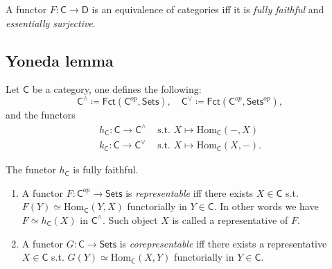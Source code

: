 \begin{prop}
	A functor $F\colon \mathsf{C} \to \mathsf{D}$ is an equivalence of categories iff it is {\em fully faithful} and {\em essentially surjective}.
\end{prop} 

\subsection{Yoneda lemma}

\begin{defn}[]
	Let $\mathsf{C}$ be a category, one defines the following:
	\begin{equation}
	\mathsf{C}^\wedge \coloneqq \mathsf{Fct}\left(\mathsf{C}^{op}, \mathsf{Sets} \right), \quad \mathsf{C}^\vee \coloneqq \mathsf{Fct}\left(\mathsf{C}^{op}, \mathsf{Sets}^{op} \right)
	,\end{equation} 
	and the functors
	\begin{align}
		h_\mathsf{C}\colon \mathsf{C} \to \mathsf{C}^\wedge &\text{ s.t. }
		X \mapsto \mathrm{Hom}_{\mathsf{\mathsf{C}}} \left( -, X \right)\\
		k_\mathsf{C}\colon \mathsf{C} \to \mathsf{C}^\vee &\text{ s.t. }
		X \mapsto \mathrm{Hom}_{\mathsf{\mathsf{C}}} \left( X, - \right)
	.\end{align}
\end{defn}

\begin{lem}[Yoneda]
	The functor $h_\mathsf{C}$ is fully faithful.
\end{lem} 

\begin{defn}\leavevmode\vspace{-\baselineskip}
	\begin{enumerate}
		\item A functor $F\colon \mathsf{C}^{op} \to \mathsf{Sets}$ is {\em representable} iff there exists $X \in \mathsf{C}$ s.t. $F(Y) \simeq \mathrm{Hom}_{\mathsf{C}} \left( Y, X \right)$ functorially in $Y \in \mathsf{C}$.
			In other words we have $F \simeq h_\mathsf{C}(X)$ in $\mathsf{C}^{\wedge}$. 
			Such object $X$ is called a representative of $F$.
		\item A functor $G\colon \mathsf{C} \to \mathsf{Sets}$ is {\em corepresentable} iff there exists a representative $X \in \mathsf{C}$ s.t. $G(Y) \simeq \mathrm{Hom}_{\mathsf{C}} \left( X, Y \right)$ functorially in $Y \in \mathsf{C}$.
	\end{enumerate} 
\end{defn}


